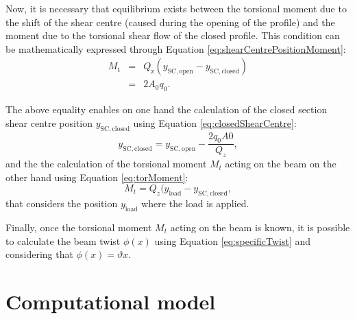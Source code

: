   Now, it is necessary that equilibrium exists between the torsional moment due to the shift of the shear centre (caused during the opening of the profile) and the moment due to the torsional shear flow of the closed profile. This condition can be mathematically expressed through Equation \ref{eq:shearCentrePositionMoment}:
  \begin{eqnarray}\label{eq:shearCentrePositionMoment}
    M_\mathrm{t} &=& Q_\mathrm{z} (y_{\mathrm{SC,open}} - y_{\mathrm{SC,closed}}) \nonumber \\
    &=& 2 A_0 q_0.
  \end{eqnarray}

  The above equality enables on one hand the calculation of the closed section shear centre position $y_{\mathrm{SC,closed}}$ using Equation \ref{eq:closedShearCentre}:
  \begin{equation} \label{eq:closedShearCentre}
    y_{\mathrm{SC,closed}} = y_{\mathrm{SC,open}} - \frac{2 q_0 A0}{Q_z},
  \end{equation}
  and the the calculation of the torsional moment $M_t$ acting on the beam on the other hand using Equation \ref{eq:torMoment}:
  \begin{equation} \label{eq:torMoment}
    M_t = Q_z (y_{\mathrm{load}} - y_{\mathrm{SC,closed}},
  \end{equation}
  that considers the position $y_{\mathrm{load}}$ where the load is applied.

  Finally, once the torsional moment $M_t$ acting on the beam is known, it is possible to calculate the beam twist $\phi(x)$ using Equation \ref{eq:specificTwist} and considering that $\phi(x) = \vartheta x$.

\section{Computational model} \label{sec:computationalModel}

